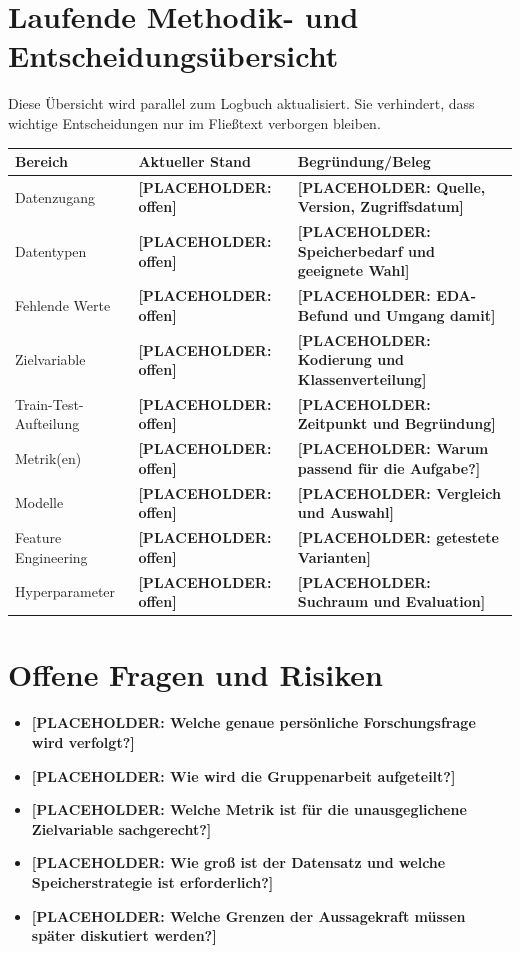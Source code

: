 \documentclass[11pt,a4paper]{article}
\newcommand{\placeholder}[1]{\textcolor{ADAgold}{\textbf{[PLACEHOLDER: #1]}}}
\providecommand{\placeholder}[1]{\textcolor{ADAgold}{\textbf{[PLACEHOLDER: #1]}}}
\begin{document}
\section{Laufende Methodik- und Entscheidungsübersicht}

Diese Übersicht wird parallel zum Logbuch aktualisiert. Sie verhindert, dass wichtige
Entscheidungen nur im Fließtext verborgen bleiben.

\begin{longtable}{p{}p{}p{}}
\toprule
\textbf{Bereich} & \textbf{Aktueller Stand} & \textbf{Begründung/Beleg} \\
\midrule
Datenzugang & \placeholder{offen} & \placeholder{Quelle, Version, Zugriffsdatum} \\
Datentypen & \placeholder{offen} & \placeholder{Speicherbedarf und geeignete Wahl} \\
Fehlende Werte & \placeholder{offen} & \placeholder{EDA-Befund und Umgang damit} \\
Zielvariable & \placeholder{offen} & \placeholder{Kodierung und Klassenverteilung} \\
Train-Test-Aufteilung & \placeholder{offen} & \placeholder{Zeitpunkt und Begründung} \\
Metrik(en) & \placeholder{offen} & \placeholder{Warum passend für die Aufgabe?} \\
Modelle & \placeholder{offen} & \placeholder{Vergleich und Auswahl} \\
Feature Engineering & \placeholder{offen} & \placeholder{getestete Varianten} \\
Hyperparameter & \placeholder{offen} & \placeholder{Suchraum und Evaluation} \\
\bottomrule
\end{longtable}

\section{Offene Fragen und Risiken}

\begin{itemize}
  \item \placeholder{Welche genaue persönliche Forschungsfrage wird verfolgt?}
  \item \placeholder{Wie wird die Gruppenarbeit aufgeteilt?}
  \item \placeholder{Welche Metrik ist für die unausgeglichene Zielvariable sachgerecht?}
  \item \placeholder{Wie groß ist der Datensatz und welche Speicherstrategie ist erforderlich?}
  \item \placeholder{Welche Grenzen der Aussagekraft müssen später diskutiert werden?}
\end{itemize}
\end{document}
